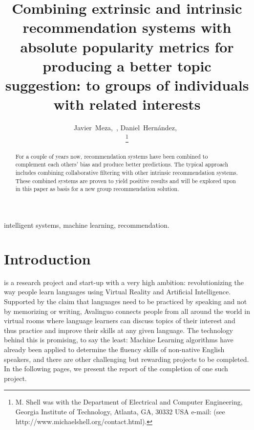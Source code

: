 \documentclass[journal]{IEEEtran}
\begin{document}
\title{
Combining extrinsic and intrinsic recommendation systems with
absolute popularity metrics for producing a better topic suggestion: to
groups of individuals with related interests
}

\author{
Javier~Meza,~,
Daniel~Hernández,~

\thanks{M. Shell was with the Department
of Electrical and Computer Engineering, Georgia Institute of Technology,
Atlanta, GA, 30332 USA e-mail:
(see http://www.michaelshell.org/contact.html).}
}


\maketitle

\begin{abstract}
For a couple of years now, recommendation systems have been combined to
complement each others’ bias and produce better predictions. The typical
approach includes combining collaborative filtering with other intrinsic
recommendation systems. These combined systems are proven to
yield positive results and will be explored upon in this paper as basis
for a new group recommendation solution.
\end{abstract}

\begin{IEEEkeywords}
intelligent systems, machine learning, recommendation.
\end{IEEEkeywords}

\IEEEpeerreviewmaketitle


\section{Introduction}

 is a research project and start-up with a
very high ambition: revolutionizing the way people learn languages using
Virtual Reality and Artificial Intelligence. Supported by the claim that
languages need to be practiced by speaking and not by memorizing or
writing, Avalinguo connects people from all around the world in virtual
rooms where language learners can discuss topics of their interest and
thus practice and improve their skills at any given language. The
technology behind this is promising, to say the least: Machine Learning
algorithms have already been applied to determine the fluency skills of
non-native English speakers, and there are other challenging but
rewarding projects to be completed. In the following pages, we present
the report of the completion of one such project.
\end{document}
